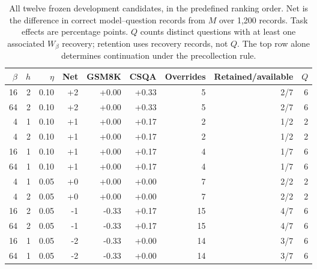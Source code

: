 \begin{table}[!t]\centering\small
\caption{All twelve frozen development candidates, in the predefined ranking order. Net is the difference in correct model--question records from $M$ over 1,200 records. Task effects are percentage points. $Q$ counts distinct questions with at least one associated $W_\beta$ recovery; retention uses recovery records, not $Q$. The top row alone determines continuation under the precollection rule.}\label{tab:all-successor-candidates}
\begin{tabular}{@{}rrr rrr rrr@{}}\toprule
$\beta$ & $h$ & $\eta$ & Net & GSM8K & CSQA & Overrides & Retained/available & $Q$\\\midrule
16 & 2 & 0.10 & +2 & +0.00 & +0.33 & 5 & 2/7 & 6\\
64 & 2 & 0.10 & +2 & +0.00 & +0.33 & 5 & 2/7 & 6\\
4 & 1 & 0.10 & +1 & +0.00 & +0.17 & 2 & 1/2 & 2\\
4 & 2 & 0.10 & +1 & +0.00 & +0.17 & 2 & 1/2 & 2\\
16 & 1 & 0.10 & +1 & +0.00 & +0.17 & 4 & 1/7 & 6\\
64 & 1 & 0.10 & +1 & +0.00 & +0.17 & 4 & 1/7 & 6\\
4 & 1 & 0.05 & +0 & +0.00 & +0.00 & 7 & 2/2 & 2\\
4 & 2 & 0.05 & +0 & +0.00 & +0.00 & 7 & 2/2 & 2\\
16 & 2 & 0.05 & -1 & -0.33 & +0.17 & 15 & 4/7 & 6\\
64 & 2 & 0.05 & -1 & -0.33 & +0.17 & 15 & 4/7 & 6\\
16 & 1 & 0.05 & -2 & -0.33 & +0.00 & 14 & 3/7 & 6\\
64 & 1 & 0.05 & -2 & -0.33 & +0.00 & 14 & 3/7 & 6\\
\bottomrule\end{tabular}\end{table}
